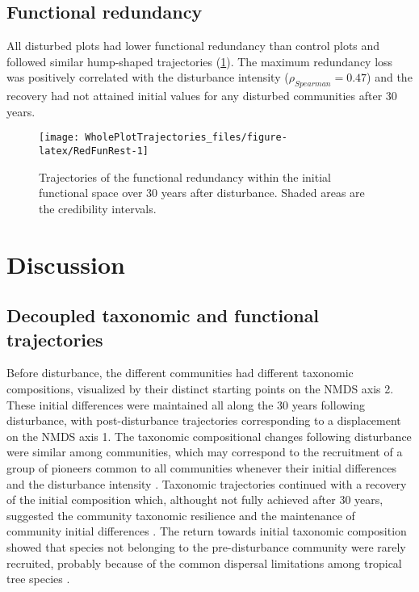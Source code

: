 \documentclass[fleqn,10pt]{ArtEcoFoG} %
\begin{document}
\subsection{Functional redundancy}\label{functional-redundancy}

All disturbed plots had lower functional redundancy than control plots
and followed similar hump-shaped trajectories (\ref{fig:RedFunRest}).
The maximum redundancy loss was positively correlated with the
disturbance intensity (\(\rho_{Spearman}=0.47\)) and the recovery had
not attained initial values for any disturbed communities after 30
years.

\begin{figure}

{\centering \texttt{[image: WholePlotTrajectories\_files/figure-latex/RedFunRest-1]} 

}

\caption{Trajectories of the functional redundancy within the initial functional space over 30 years after disturbance. Shaded areas are the credibility intervals.}\label{fig:RedFunRest}
\end{figure}

\section{Discussion}\label{discussion}

\subsection{Decoupled taxonomic and functional
trajectories}\label{decoupled-taxonomic-and-functional-trajectories}

Before disturbance, the different communities had different taxonomic
compositions, visualized by their distinct starting points on the NMDS
axis 2. These initial differences were maintained all along the 30 years
following disturbance, with post-disturbance trajectories corresponding
to a displacement on the NMDS axis 1. The taxonomic compositional
changes following disturbance were similar among communities, which may
correspond to the recruitment of a group of pioneers common to all
communities whenever their initial differences and the disturbance
intensity \citep{Denslow2000, Bongers2009}. Taxonomic trajectories
continued with a recovery of the initial composition which, althought
not fully achieved after 30 years, suggested the community taxonomic
resilience and the maintenance of community initial differences
\citep{Folke2006}. The return towards initial taxonomic composition
showed that species not belonging to the pre-disturbance community were
rarely recruited, probably because of the common dispersal limitations
among tropical tree species \citep{Svenning2005}.
\end{document}

